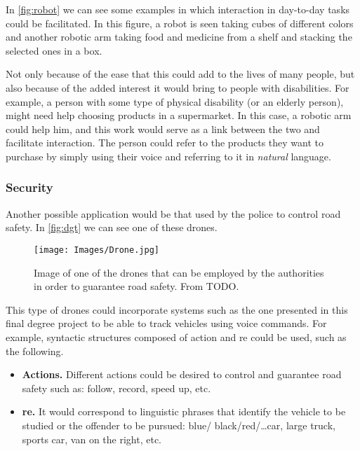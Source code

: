In \vref{fig:robot} we can see some examples in which interaction in day-to-day
tasks could be facilitated. In this figure, a robot is seen taking cubes of
different colors and another robotic arm taking food and medicine from a shelf
and stacking the selected ones in a box.

Not only because of the ease that this could add to the lives of many people,
but also because of the added interest it would bring to people with
disabilities. For example, a person with some type of physical disability (or
an elderly person), might need help choosing products in a supermarket. In this
case, a robotic arm could help him, and this work would serve as a link between
the two and facilitate interaction. The person could refer to the products they
want to purchase by simply using their voice and referring to it in
\emph{natural} language.

\subsubsection{Security}

Another possible application would be that used by the police to control road
safety. In \vref{fig:dgt} we can see one of these drones.

\begin{figure}[ht]
  \centering
  \texttt{[image: Images/Drone.jpg]}
  \caption[Drones employed for road safety]{Image of one of the drones that can
    be employed by the authorities in order to guarantee road safety. From
    TODO.}\label{fig:dgt}
\end{figure}

This type of drones could incorporate systems such as the one presented in this
final degree project to be able to track vehicles using voice commands. For
example, syntactic structures composed of action and \gls{re} could be used,
such as the following.

\begin{itemize}
  \item \textbf{Actions.} Different actions could be desired to control and
  guarantee road safety such as: follow, record, speed up, etc.
  \item \textbf{\gls{re}.} It would correspond to linguistic phrases that
  identify the vehicle to be studied or the offender to be pursued: blue/
  black/red/\ldots car, large truck, sports car, van on the right, etc.
\end{itemize}

